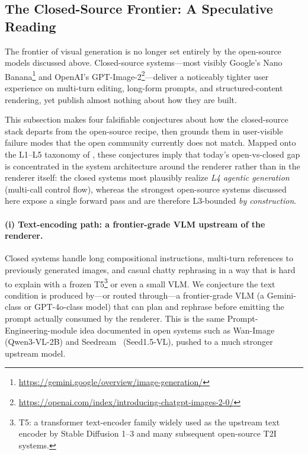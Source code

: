 \documentclass{llmxive}
\begin{document}
\subsection{The Closed-Source Frontier: A Speculative Reading}
\label{sec:closed_source_frontier}

The frontier of visual generation is no longer set entirely by the open-source models discussed above. Closed-source systems---most visibly Google's Nano Banana\footnote{\url{https://gemini.google/overview/image-generation/}} and OpenAI's GPT-Image-2\footnote{\url{https://openai.com/index/introducing-chatgpt-images-2-0/}}---deliver a noticeably tighter user experience on multi-turn editing, long-form prompts, and structured-content rendering, yet publish almost nothing about how they are built.

This subsection makes four falsifiable conjectures about how the closed-source stack departs from the open-source recipe, then grounds them in user-visible failure modes that the open community currently does not match. Mapped onto the L1--L5 taxonomy of , these conjectures imply that today's open-vs-closed gap is concentrated in the system architecture around the renderer rather than in the renderer itself: the closed systems most plausibly realize \emph{L4 agentic generation} (multi-call control flow), whereas the strongest open-source systems discussed here expose a single forward pass and are therefore L3-bounded \emph{by construction}.

\paragraph{(i) Text-encoding path: a frontier-grade VLM upstream of the renderer.}
Closed systems handle long compositional instructions, multi-turn references to previously generated images, and casual chatty rephrasing in a way that is hard to explain with a frozen T5\footnote{T5: a transformer text-encoder family widely used as the upstream text encoder by Stable Diffusion 1--3 and many subsequent open-source T2I systems.} or even a small VLM. We conjecture the text condition is produced by---or routed through---a frontier-grade VLM (a Gemini-class or GPT-4o-class model) that can plan and rephrase before emitting the prompt actually consumed by the renderer. This is the same Prompt-Engineering-module idea documented in open systems such as Wan-Image~\citep{mao2026wan} (Qwen3-VL-2B) and Seedream~\citep{seedream2025seedream} (Seed1.5-VL), pushed to a much stronger upstream model.
\end{document}
